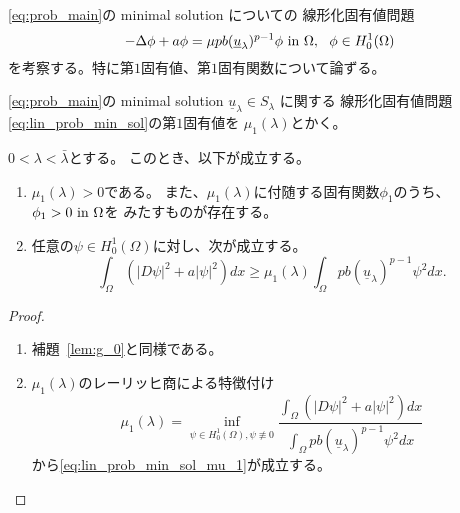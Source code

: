 \ref{eq:prob_main}の minimal solution についての
線形化固有値問題
\begin{equation}
 -\Delta \phi + a \phi = \mu p b (\underline{u}_\lambda)^{p-1} \phi
  ~\text{in}~ \Omega, \ \ \phi \in H_0^1(\Omega) \label{eq:lin_prob_min_sol}
\end{equation}
を考察する。特に第$1$固有値、第$1$固有関数について論ずる。

\begin{nota}
 \ref{eq:prob_main}の
 minimal solution $\underline{u}_\lambda \in S_\lambda$ に関する
 線形化固有値問題\eqref{eq:lin_prob_min_sol}の第$1$固有値を
 $\mu_1(\lambda)$とかく。
\end{nota}

\begin{lem} \label{lem:lin_p}
 $0 < \lambda < \bar{\lambda}$とする。
 このとき、以下が成立する。
 \begin{enumerate}[1.] \sage
  \item $\mu_1(\lambda) > 0$である。
        また、$\mu_1(\lambda)$に付随する固有関数$\phi_1$のうち、
        $\phi_1 > 0 ~\text{in}~ \Omega$を
        みたすものが存在する。
  \item 任意の$\psi \in H_0^1(\Omega)$に対し、次が成立する。
        \begin{equation}
         \int_\Omega \left( \lvert D\psi \rvert^2 + a \lvert \psi
                      \rvert^2 \right)
          dx \geq \mu_1(\lambda) \int_\Omega pb(\underline{u}_\lambda)^{p-1}
          \psi^2 dx. \label{eq:lin_prob_min_sol_mu_1}
        \end{equation}
 \end{enumerate}
\end{lem}

\begin{proof}
 \begin{enumerate}[1.] \sage
  \item 補題~\ref{lem:g_0}と同様である。
  \item $\mu_1(\lambda)$のレーリッヒ商による特徴付け
        \begin{equation}
         \mu_1(\lambda) = \inf_{\psi \in H_0^1(\Omega), \psi \not \equiv 0} 
        \frac{\displaystyle \int_\Omega 
        \left( \left\lvert D\psi \right\rvert^2 + a\lvert\psi\rvert^2 \right)
          dx }{\displaystyle \int_\Omega pb(\underline{u}_\lambda)^{p-1}
          \psi^2 dx } \label{eq:mu1_quotient}        
        \end{equation}
        から\eqref{eq:lin_prob_min_sol_mu_1}が成立する。
 \end{enumerate}
\end{proof}

